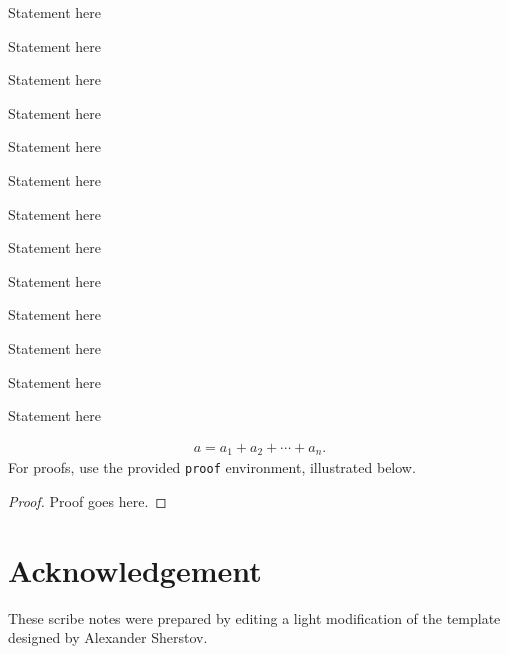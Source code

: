 \documentclass[usletter]{article}
\begin{document}
\begin{theorem}
Statement here 
\end{theorem}

\begin{lemma}
Statement here
\end{lemma}

\begin{corollary}
Statement here
\end{corollary}

\begin{proposition}
Statement here
\end{proposition}

\begin{fact}
Statement here
\end{fact}

\begin{claim}
Statement here
\end{claim}

\begin{definition}
Statement here
\end{definition}

\begin{example}
Statement here
\end{example}

\begin{assumption}
Statement here
\end{assumption}

\begin{remark}
Statement here
\end{remark}

\begin{conjecture}
Statement here
\end{conjecture}

\begin{openproblem}
Statement here
\end{openproblem}

\begin{problem}
Statement here
\end{problem}


\noindent
\begin{align}
a = a_1+a_2+\cdots+a_n.
\end{align}
\noindent
For proofs, use the provided {\tt proof} environment,
illustrated below.

\begin{proof}
Proof goes here.
\end{proof}

\section*{Acknowledgement}
These scribe notes were prepared by editing a light modification of the template designed by Alexander Sherstov.



\end{document}
